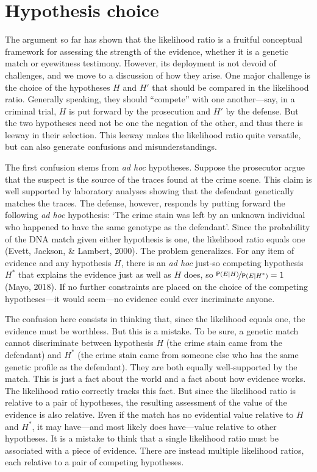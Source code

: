 \documentclass[
  10pt,
  dvipsnames,enabledeprecatedfontcommands]{scrartcl}
\newcommand{\pr}[1]{\mathsf{P}(#1)}
\begin{document}
\hypertarget{hypothesis-choice}{%
\section{\texorpdfstring{Hypothesis choice
\label{sec:hchoice}}{Hypothesis choice }}\label{hypothesis-choice}}

The argument so far has shown that the likelihood ratio is a fruitful
conceptual framework for assessing the strength of the evidence, whether
it is a genetic match or eyewitness testimony. However, its deployment
is not devoid of challenges, and we move to a discussion of how they
arise. One major challenge is the choice of the hypotheses \(H\) and
\(H'\) that should be compared in the likelihood ratio. Generally
speaking, they should ``compete'' with one another---say, in a criminal
trial, \(H\) is put forward by the prosecution and \(H'\) by the
defense. But the two hypotheses need not be one the negation of the
other, and thus there is leeway in their selection. This leeway makes
the likelihood ratio quite versatile, but can also generate confusions
and misunderstandings.

The first confusion stems from \textit{ad hoc} hypotheses. Suppose the
prosecutor argue that the suspect is the source of the traces found at
the crime scene. This claim is well supported by laboratory analyses
showing that the defendant genetically matches the traces. The defense,
however, responds by putting forward the following \textit{ad hoc}
hypothesis: `The crime stain was left by an unknown individual who
happened to have the same genotype as the defendant'. Since the
probability of the DNA match given either hypothesis is one, the
likelihood ratio equals one (Evett, Jackson, \& Lambert, 2000). The
problem generalizes. For any item of evidence and any hypothesis \(H\),
there is an \textit{ad hoc} just-so competing hypothesis \(H^*\) that
explains the evidence just as well as \(H\) does, so
\(\nicefrac{\pr{E \vert H}}{\pr{E \vert H^*}}=1\) (Mayo, 2018). If no
further constraints are placed on the choice of the competing
hypotheses---it would seem---no evidence could ever incriminate anyone.

The confusion here consists in thinking that, since the likelihood
equals one, the evidence must be worthless. But this is a mistake. To be
sure, a genetic match cannot discriminate between hypothesis \(H\) (the
crime stain came from the defendant) and \(H^*\) (the crime stain came
from someone else who has the same genetic profile as the defendant).
They are both equally well-supported by the match. This is just a fact
about the world and a fact about how evidence works. The likelihood
ratio correctly tracks this fact. But since the likelihood ratio is
relative to a pair of hypotheses, the resulting assessment of the value
of the evidence is also relative. Even if the match has no evidential
value relative to \(H\) and \(H^*\), it may have---and most likely does
have---value relative to other hypotheses. It is a mistake to think that
a single likelihood ratio must be associated with a piece of evidence.
There are instead multiple likelihood ratios, each relative to a pair of
competing hypotheses.
\end{document}
